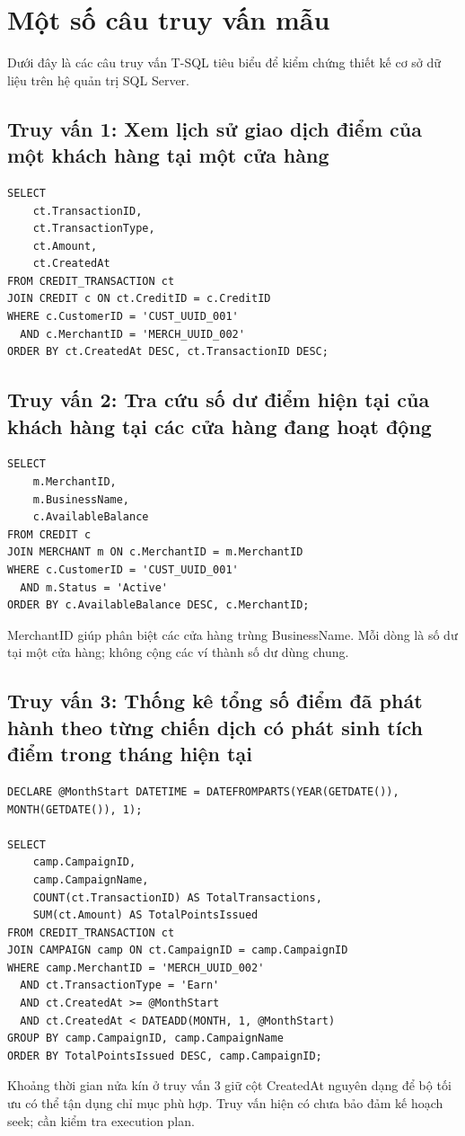 \section{Một số câu truy vấn mẫu}

Dưới đây là các câu truy vấn T-SQL tiêu biểu để kiểm chứng thiết kế cơ sở dữ liệu trên hệ quản trị SQL Server.

\subsection{Truy vấn 1: Xem lịch sử giao dịch điểm của một khách hàng tại một cửa hàng}
\begin{lstlisting}[style=sqlstyle]
SELECT 
    ct.TransactionID,
    ct.TransactionType,
    ct.Amount,
    ct.CreatedAt
FROM CREDIT_TRANSACTION ct
JOIN CREDIT c ON ct.CreditID = c.CreditID
WHERE c.CustomerID = 'CUST_UUID_001'
  AND c.MerchantID = 'MERCH_UUID_002'
ORDER BY ct.CreatedAt DESC, ct.TransactionID DESC;
\end{lstlisting}

\subsection{Truy vấn 2: Tra cứu số dư điểm hiện tại của khách hàng tại các cửa hàng đang hoạt động}
\begin{lstlisting}[style=sqlstyle]
SELECT 
    m.MerchantID,
    m.BusinessName,
    c.AvailableBalance
FROM CREDIT c
JOIN MERCHANT m ON c.MerchantID = m.MerchantID
WHERE c.CustomerID = 'CUST_UUID_001'
  AND m.Status = 'Active'
ORDER BY c.AvailableBalance DESC, c.MerchantID;
\end{lstlisting}
MerchantID giúp phân biệt các cửa hàng trùng BusinessName. Mỗi dòng là số dư tại một cửa hàng; không cộng các ví thành số dư dùng chung.


\subsection{Truy vấn 3: Thống kê tổng số điểm đã phát hành theo từng chiến dịch có phát sinh tích điểm trong tháng hiện tại}
\begin{lstlisting}[style=sqlstyle]
DECLARE @MonthStart DATETIME = DATEFROMPARTS(YEAR(GETDATE()), MONTH(GETDATE()), 1);

SELECT 
    camp.CampaignID,
    camp.CampaignName,
    COUNT(ct.TransactionID) AS TotalTransactions,
    SUM(ct.Amount) AS TotalPointsIssued
FROM CREDIT_TRANSACTION ct
JOIN CAMPAIGN camp ON ct.CampaignID = camp.CampaignID
WHERE camp.MerchantID = 'MERCH_UUID_002'
  AND ct.TransactionType = 'Earn'
  AND ct.CreatedAt >= @MonthStart
  AND ct.CreatedAt < DATEADD(MONTH, 1, @MonthStart)
GROUP BY camp.CampaignID, camp.CampaignName
ORDER BY TotalPointsIssued DESC, camp.CampaignID;
\end{lstlisting}
Khoảng thời gian nửa kín ở truy vấn 3 giữ cột CreatedAt nguyên dạng để bộ tối ưu có thể tận dụng chỉ mục phù hợp. Truy vấn hiện có chưa bảo đảm kế hoạch seek; cần kiểm tra execution plan.

